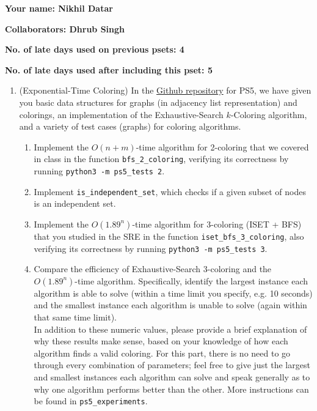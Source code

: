 \documentclass[11pt]{article}
\begin{document}

\textbf{Your name: Nikhil Datar}

\textbf{Collaborators: Dhrub Singh}

\textbf{No. of late days used on previous psets: 4}

\textbf{No. of late days used after including this pset: 5}

\begin{enumerate}
 
 \item (Exponential-Time Coloring) 
  In the \href{https://github.com/Harvard-CS-120/cs120/tree/main/fall2022/psets}{Github repository} for PS5, we have given you basic data structures for graphs (in adjacency list representation) and colorings, an implementation of the Exhaustive-Search $k$-Coloring algorithm, and a variety of test cases (graphs) for coloring algorithms. 

  \begin{enumerate}
      \item Implement the $O(n+m)$-time algorithm for 2-coloring that we covered in class in the function \texttt{bfs\_2\_coloring}, verifying its correctness by running \texttt{python3 -m ps5\_tests 2}.
      
      \item Implement \texttt{is\_independent\_set}, which checks if a given subset of nodes is an independent set.
      
      \item Implement the $O(1.89^n)$-time algorithm for 3-coloring (ISET + BFS) that you studied in the SRE in the function \texttt{iset\_bfs\_3\_coloring}, also verifying its correctness by running \texttt{python3 -m ps5\_tests 3}. \label{part:TbT}
      
      \item Compare the efficiency of Exhaustive-Search 3-coloring and the $O(1.89^n)$-time algorithm. Specifically, identify the largest instance each algorithm is able to solve (within a time limit you specify, e.g. 10 seconds) and the smallest instance each algorithm is unable to solve (again within that same time limit). \\
    
    In addition to these numeric values, please provide a brief explanation of why these results make sense, based on your knowledge of how each algorithm finds a valid coloring. For this part, there is no need to go through every combination of parameters; feel free to give just the largest and smallest instances each algorithm can solve and speak generally as to why one algorithm performs better than the other. More instructions can be found in \texttt{ps5\_experiments}. \\
    

\end{enumerate}
\end{enumerate}
\end{document}
